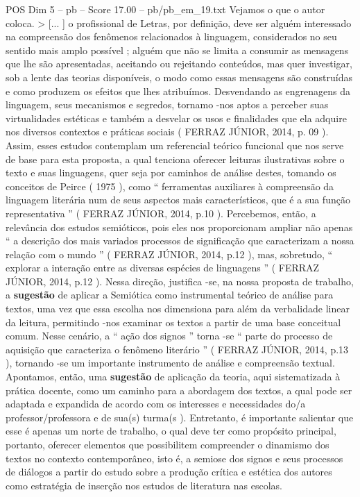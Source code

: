 \begin{textsample}{POS Dim 5 – pb – Score 17.00 – pb/pb\_em\_19.txt}
Vejamos o que o autor coloca. > [... ] o profissional de Letras, por definição, deve ser alguém interessado na compreensão dos fenômenos relacionados à linguagem, considerados no seu sentido mais amplo possível ; alguém que não se limita a consumir as mensagens que lhe são apresentadas, aceitando ou rejeitando conteúdos, mas quer investigar, sob a lente das teorias disponíveis, o modo como essas mensagens são construídas e como produzem os efeitos que lhes atribuímos.
Desvendando as engrenagens da linguagem, seus mecanismos e segredos, tornamo -nos aptos a perceber suas virtualidades estéticas e também a desvelar os usos e finalidades que ela adquire nos diversos contextos e práticas sociais ( FERRAZ JÚNIOR, 2014, p. 09 ).
Assim, esses estudos contemplam um referencial teórico funcional que nos serve de base para esta proposta, a qual tenciona oferecer leituras ilustrativas sobre o texto e suas linguagens, quer seja por caminhos de análise destes, tomando os conceitos de Peirce ( 1975 ), como “ ferramentas auxiliares à compreensão da linguagem literária num de seus aspectos mais característicos, que é a sua função representativa ” ( FERRAZ JÚNIOR, 2014, p.10 ).
Percebemos, então, a relevância dos estudos semióticos, pois eles nos proporcionam ampliar não apenas “ a descrição dos mais variados processos de significação que caracterizam a nossa relação com o mundo ” ( FERRAZ JÚNIOR, 2014, p.12 ), mas, sobretudo, “ explorar a interação entre as diversas espécies de linguagens ” ( FERRAZ JÚNIOR, 2014, p.12 ).
Nessa direção, justifica -se, na nossa proposta de trabalho, a \textbf{sugestão} de aplicar a Semiótica como instrumental teórico de análise para textos, uma vez que essa escolha nos dimensiona para além da verbalidade linear da leitura, permitindo -nos examinar os textos a partir de uma base conceitual comum.
Nesse cenário, a “ ação dos signos ” torna -se “ parte do processo de aquisição que caracteriza o fenômeno literário ” ( FERRAZ JÚNIOR, 2014, p.13 ), tornando -se um importante instrumento de análise e compreensão textual.
Apontamos, então, uma \textbf{sugestão} de aplicação da teoria, aqui sistematizada à prática docente, como um caminho para a abordagem dos textos, a qual pode ser adaptada e expandida de acordo com os interesses e necessidades do/a professor/professora e de sua(s) turma(s ).
Entretanto, é importante salientar que esse é apenas um norte de trabalho, o qual deve ter como propósito principal, portanto, oferecer elementos que possibilitem compreender o dinamismo dos textos no contexto contemporâneo, isto é, a semiose dos signos e seus processos de diálogos a partir do estudo sobre a produção crítica e estética dos autores como estratégia de inserção nos estudos de literatura nas escolas.

\end{textsample}
